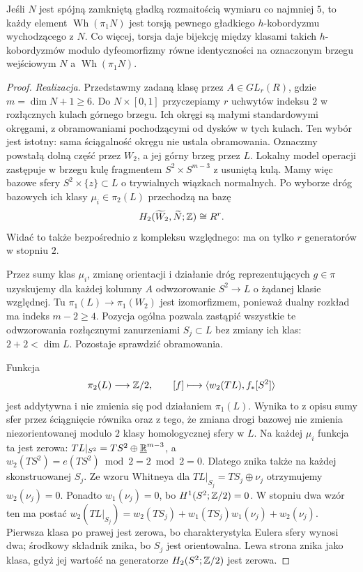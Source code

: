 \begin{twierdzenie}
\label{thm:klasyfikacja-hc-20}
Jeśli $N$ jest spójną zamkniętą gładką rozmaitością
wymiaru co najmniej $5$, to każdy element
$\operatorname{Wh}(\pi_1N)$ jest torsją pewnego
gładkiego $h$-kobordyzmu wychodzącego z $N$.
Co więcej, torsja daje bijekcję między klasami
takich $h$-kobordyzmów modulo dyfeomorfizmy równe identyczności
na oznaczonym brzegu wejściowym $N$ a
$\operatorname{Wh}(\pi_1N)$.
\end{twierdzenie}
\begin{proof}
\emph{Realizacja.} Przedstawmy zadaną klasę przez
$A\in GL_r(R)$, gdzie $m=\dim N+1\geq6$.
Do $N\times[0,1]$ przyczepiamy $r$ uchwytów indeksu $2$
w rozłącznych kulach górnego brzegu. Ich okręgi są małymi
standardowymi okręgami, z obramowaniami pochodzącymi od dysków
w tych kulach. Ten wybór jest istotny: sama ściągalność okręgu
nie ustala obramowania. Oznaczmy powstałą dolną część przez
$W_2$, a jej górny brzeg przez $L$.
Lokalny model operacji zastępuje w brzegu kulę fragmentem
$S^2\times S^{m-3}$ z usuniętą kulą. Mamy więc bazowe sfery
$S^2\times\{z\}\subset L$ o trywialnych wiązkach normalnych.
Po wyborze dróg bazowych ich klasy $\mu_i\in\pi_2(L)$
przechodzą na bazę
\[
 H_2(\widetilde W_2,\widetilde N;\mathbb{Z})\cong R^r.
\]
Widać to także bezpośrednio z kompleksu względnego:
ma on tylko $r$ generatorów w stopniu $2$.

Przez sumy klas $\mu_i$, zmianę orientacji i działanie
dróg reprezentujących $g\in\pi$ uzyskujemy dla każdej kolumny
$A$ odwzorowanie $S^2\to L$ o żądanej klasie względnej.
Tu $\pi_1(L)\to\pi_1(W_2)$ jest izomorfizmem, ponieważ
dualny rozkład ma indeks $m-2\geq4$.
Pozycja ogólna pozwala zastąpić wszystkie te odwzorowania
rozłącznymi zanurzeniami $S_j\subset L$ bez zmiany ich klas:
$2+2<\dim L$. Pozostaje sprawdzić obramowania.

Funkcja
\[
 \pi_2(L)\longrightarrow\mathbb{Z}/2,\qquad
 [f]\longmapsto\langle w_2(TL),f_*[S^2]\rangle
\]
jest addytywna i nie zmienia się pod działaniem $\pi_1(L)$.
Wynika to z opisu sumy sfer przez ściągnięcie równika
oraz z tego, że zmiana drogi bazowej nie zmienia niezorientowanej
modulo $2$ klasy homologycznej sfery w $L$.
Na każdej $\mu_i$ funkcja ta jest zerowa:
$TL|_{S^2}=TS^2\oplus\underline{\mathbb{R}}^{m-3}$,
a $w_2(TS^2)=e(TS^2)\bmod2=2\bmod2=0$.
Dlatego znika także na każdej skonstruowanej $S_j$.
Ze wzoru Whitneya dla $TL|_{S_j}=TS_j\oplus\nu_j$
otrzymujemy $w_2(\nu_j)=0$. Ponadto $w_1(\nu_j)=0$,
bo $H^1(S^2;\mathbb{Z}/2)=0$.
W stopniu dwa wzór ten ma postać
$w_2(TL|_{S_j})=w_2(TS_j)+w_1(TS_j)w_1(\nu_j)+w_2(\nu_j)$.
Pierwsza klasa po prawej jest zerowa, bo charakterystyka
Eulera sfery wynosi dwa; środkowy składnik znika,
bo $S_j$ jest orientowalna. Lewa strona znika jako klasa,
gdyż jej wartość na generatorze $H_2(S^2;\mathbb{Z}/2)$ jest zerowa.


\end{proof}
